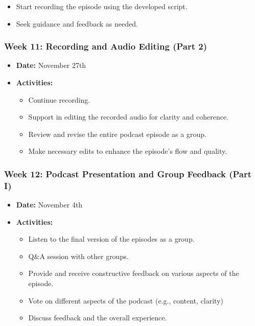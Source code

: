 \documentclass[
  letterpaper,
  DIV=11,
  numbers=noendperiod]{scrreprt}
\providecommand{\tightlist}{%
  \setlength{\itemsep}{0pt}\setlength{\parskip}{0pt}}\usepackage{longtable,booktabs,array}
\begin{document}
\begin{tcolorbox}
\begin{itemize}
  \begin{itemize}
  \tightlist
  \item
    Start recording the episode using the developed script.
  \item
    Seek guidance and feedback as needed.
  \end{itemize}
\end{itemize}

\subsubsection{Week 11: Recording and Audio Editing (Part
2)}\label{week-11-recording-and-audio-editing-part-2}

\begin{itemize}
\tightlist
\item
  \textbf{Date:} November 27th
\item
  \textbf{Activities:}

  \begin{itemize}
  \tightlist
  \item
    Continue recording.
  \item
    Support in editing the recorded audio for clarity and coherence.
  \item
    Review and revise the entire podcast episode as a group.
  \item
    Make necessary edits to enhance the episode's flow and quality.
  \end{itemize}
\end{itemize}

\subsubsection{Week 12: Podcast Presentation and Group Feedback (Part
I)}\label{week-12-podcast-presentation-and-group-feedback-part-i}

\begin{itemize}
\tightlist
\item
  \textbf{Date:} November 4th
\item
  \textbf{Activities:}

  \begin{itemize}
  \tightlist
  \item
    Listen to the final version of the episodes as a group.
  \item
    Q\&A session with other groups.
  \item
    Provide and receive constructive feedback on various aspects of the
    episode.
  \item
    Vote on different aspects of the podcast (e.g., content, clarity)
  \item
    Discuss feedback and the overall experience.
  \end{itemize}
\end{itemize}

\end{tcolorbox}
\end{document}

